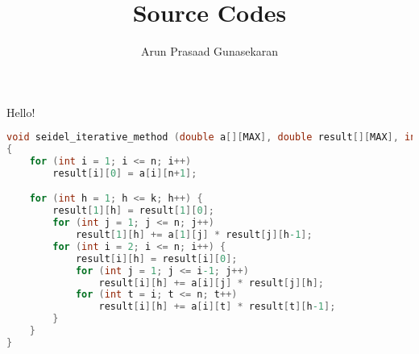 \documentclass[10pt,a4paper]{article}
\author{Arun Prasaad Gunasekaran}
\title{Source Codes}
\begin{document}
\maketitle
Hello!


\begin{lstlisting}[language=C, frame=single]
void seidel_iterative_method (double a[][MAX], double result[][MAX], int n, int k)
{
    for (int i = 1; i <= n; i++)
        result[i][0] = a[i][n+1];

    for (int h = 1; h <= k; h++) {
        result[1][h] = result[1][0];
        for (int j = 1; j <= n; j++)
            result[1][h] += a[1][j] * result[j][h-1];
        for (int i = 2; i <= n; i++) {
            result[i][h] = result[i][0];
            for (int j = 1; j <= i-1; j++)
                result[i][h] += a[i][j] * result[j][h];
            for (int t = i; t <= n; t++)
                result[i][h] += a[i][t] * result[t][h-1];
        }
    }
}
\end{lstlisting}

%
\end{document}
